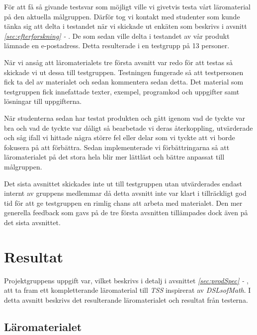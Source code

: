 \documentclass[12pt,a4paper,twoside,openright]{article}
\begin{document}
För att få så givande testsvar som möjligt ville vi givetvis testa
vårt läromaterial på den aktuella målgruppen. Därför tog vi kontakt
med studenter som kunde tänka sig att delta i testandet när vi
skickade ut enkäten som beskrivs i avsnitt
\textit{\ref{sec:efterforskning} - }. De
som sedan ville delta i testandet av vår produkt lämnade en
e-postadress. Detta resulterade i en testgrupp på 13 personer.

När vi ansåg att läromaterialets tre första avsnitt var redo för att
testas så skickade vi ut dessa till testgruppen. Testningen fungerade
så att testpersonen fick ta del av materialet och sedan kommentera
sedan detta.  Det material som testgruppen fick innefattade texter,
exempel, programkod och uppgifter samt lösningar till uppgifterna.

När studenterna sedan har testat produkten och gått igenom vad de
tyckte var bra och vad de tyckte var dåligt så bearbetade vi deras
återkoppling, utvärderade och såg ifall vi hittade några större fel
eller delar som vi tyckte att vi borde fokusera på att
förbättra. Sedan implementerade vi förbättringarna så att
läromaterialet på det stora hela blir mer lättläst och bättre anpassat
till målgruppen.

Det sista avsnittet skickades inte ut till testgruppen utan
utvärderades endast internt av gruppens medlemmar då detta avsnitt
inte var klart i tillräckligt god tid för att ge testgruppen en rimlig
chans att arbeta med materialet. Den mer generella feedback som gavs
på de tre första avsnitten tillämpades dock även på det sista
avsnittet.

\section{Resultat}


%
Projektgruppens uppgift var, vilket beskrivs i detalj i avsnittet
\textit{\ref{sec:prodSpec} - }, att ta fram ett
kompletterande läromaterial till \textit{TSS} inspirerat av
\textit{DSLsofMath}.  I detta avsnitt beskrivs det resulterande
läromaterialet och resultat från testerna.

\subsection{Läromaterialet}
\end{document}
